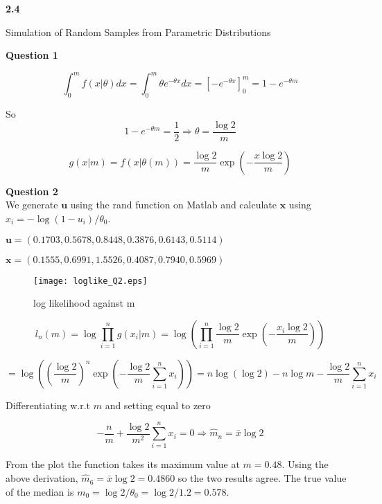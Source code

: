 \documentclass[12pt]{extarticle}
\begin{document}
\begin{flushleft}
\begin{LARGE}
\textbf{2.4}
\end{LARGE}
\end{flushleft}

\vfill
\begin{center}
\begin{Huge}Simulation of Random Samples from Parametric Distributions\end{Huge}
\end{center}
\vfill

\pagebreak


\textbf{Question 1}

$$\int_{0}^{m}f(x|\theta)dx  = \int_{0}^{m}\theta e^{-\theta x} dx = \left[-e^{-\theta x} \right]_0^m  = 1-e^{-\theta m}$$

So $$1-e^{-\theta m} = \frac{1}{2} \Rightarrow \theta = \frac{\log2}{m}$$

$$g(x|m) = f(x|\theta(m)) = \frac{\log{2}}{m}\exp{\left(-\frac{x\log{2}}{m}\right)}$$

\textbf{Question 2}\\

We generate $\textbf{u}$ using the rand function on Matlab and calculate $\textbf{x}$ using $x_i = -\log(1-u_i)/\theta_0$.

$\textbf{u} = (0.1703, 0.5678, 0.8448, 0.3876, 0.6143, 0.5114)$

$\textbf{x} = (0.1555, 0.6991,1.5526, 0.4087 ,0.7940,0.5969)$

\begin{figure}[htp!]
\centering
\texttt{[image: loglike\_Q2.eps]}\\
\caption{log likelihood against m}
\label{figure:1}
\end{figure}

$$l_n(m) = \log{\prod_{i=1}^{n} g(x_i|m)} = \log{\left(\prod_{i=1}^{n} \frac{\log{2}}{m}\exp{\left(-\frac{x_i\log2}{m}\right)}\right)}$$ 

$$ = \log{\left(\left(\frac{\log2}{m}\right)^n \exp{\left(-\frac{\log2}{m}\sum_{i=1}^{n}x_i\right)}\right)} =n\log{\left(\log{2}\right)} -n\log{m} -\frac{\log{2}}{m}\sum_{i=1}^{n}x_i$$

Differentiating w.r.t $m$ and setting equal to zero

$$-\frac{n}{m} + \frac{\log{2}}{m^2}\sum_{i=1}^{n}x_i = 0 \Rightarrow \widehat{m}_n = \bar{x}\log{2}$$

From the plot the function takes its maximum value at $m = 0.48$. Using the above derivation, $\widehat{m}_6 = \bar{x}\log{2} = 0.4860$ so the two results agree. The true value of the median is $m_0 = \log{2}/\theta_0 = \log{2}/1.2 = 0.578$.
\end{document}

